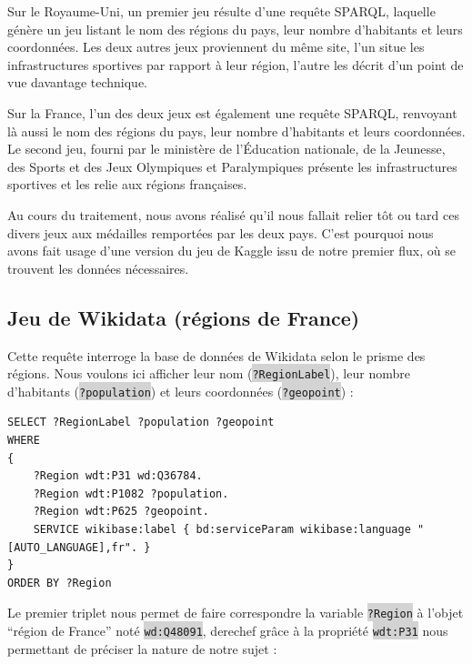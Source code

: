 \documentclass[hidelinks, 12pt]{report}
\newcommand{\code}[1]{\colorbox{LightGray}{\texttt{#1}}}
\begin{document}
Sur le Royaume-Uni, un premier jeu résulte d'une requête SPARQL, laquelle génère un jeu listant le nom des régions du pays, leur nombre d'habitants et leurs coordonnées\autocite{wikiqueryeng}. Les deux autres jeux proviennent du même site\autocite{ru}, l'un situe les infrastructures sportives par rapport à leur région, l'autre les décrit d'un point de vue davantage technique.

Sur la France, l'un des deux jeux est également une requête SPARQL, renvoyant là aussi le nom des régions du pays, leur nombre d'habitants et leurs coordonnées\autocite{wikiqueryfr}. Le second jeu, fourni par le ministère de l'Éducation nationale, de la Jeunesse, des Sports et des Jeux Olympiques et Paralympiques\autocite{ministere} présente les infrastructures sportives et les relie aux régions françaises.

Au cours du traitement, nous avons réalisé qu'il nous fallait relier tôt ou tard ces divers jeux aux médailles remportées par les deux pays. C'est pourquoi nous avons fait usage d'une version du jeu de Kaggle issu de notre premier flux, où se trouvent les données nécessaires.





%





\subsection{Jeu de Wikidata (régions de France)}

\label{queryfr}Cette requête interroge la base de données de Wikidata selon le prisme des régions. Nous voulons ici afficher leur nom (\code{?RegionLabel}), leur nombre d'habitants (\code{?population}) et leurs coordonnées (\code{?geopoint}) :

\begin{lstlisting}[language=SPARQL]
SELECT ?RegionLabel ?population ?geopoint
WHERE 
{
	?Region wdt:P31 wd:Q36784.
	?Region wdt:P1082 ?population.
	?Region wdt:P625 ?geopoint.
	SERVICE wikibase:label { bd:serviceParam wikibase:language "[AUTO_LANGUAGE],fr". }
}
ORDER BY ?Region
\end{lstlisting}

Le premier triplet nous permet de faire correspondre la variable \code{?Region} à l'objet \enquote{région de France} noté \code{wd:Q48091}, derechef grâce à la propriété \code{wdt:P31} nous permettant de préciser la nature de notre sujet :
\end{document}
